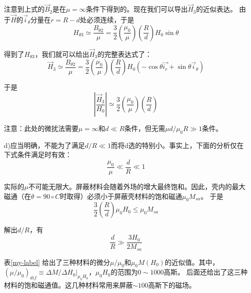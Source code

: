 注意到上式的$\vec{B}_2$是在$\mu=\infty$条件下得到的。现在我们可以导出$\vec{H}_3$的近似表达。
由于$\vec{H}$的$\vec{i}_\theta$分量在$r=R-d$处必须连续，于是
$$
H_{\theta 3}\simeq \frac{B_{\theta 2}}{\mu}=\frac{3}{2}(\frac{\mu_0}{\mu})(\frac{R}{d})H_0\sin\theta
$$

得到了$H_{\theta 3}$，我们就可以给出$\vec{H}_3$的完整表达式了：
$$
\vec{H}_3\simeq \frac{B_{\theta 2}}{\mu}=\frac{3}{2}(\frac{\mu_0}{\mu})(\frac{R}{d})H_0(-\cos\theta\vec{i_r}+\sin\theta\vec{i}_\theta)
$$

于是
$$\left|\frac{\vec{H}_3}{H_0}\right|\simeq \frac{3}{2}(\frac{\mu_0}{\mu})(\frac{R}{d})$$

注意：此处的微扰法需要$\mu=\infty$和$d\ll R$条件，但无需$\mu d/\mu_0 R \gg 1$条件。

d)应当明确，不能为了满足$d/R \ll 1$而将d选的特别小。事实上，下面的分析仅在下式条件满足时有效：
$$
\frac{\mu_0}{\mu} \ll \frac{d}{R} \ll 1
$$

实际的$\mu$不可能无限大。屏蔽材料会随着外场的增大最终饱和。因此，壳内的最大磁通（在$\theta=90\circ C$时取得）必须小于屏蔽壳材料的饱和磁通$\mu_0 M_{sa}$。
于是
$$
\frac{3}{2}(\frac{R}{d})\mu_0 H_0 \le \mu_0 M_{sa}
$$

解出$d/R$，有
$$\frac{d}{R}\gg \frac{3H_0}{2M_{sa}}$$

表\ref{my-label} 给出了三种材料的微分$\mu/\mu_0$和$\mu_0M(H_0)$的近似值。其中，$(\mu/\mu_0)_{dif}\equiv \Delta M/ \Delta H_0 |_{\mu_0 H_0}$，$\mu_0 H_0$的范围为$0\sim 1000$高斯。
后面还给出了这三种材料的饱和磁通值。这几种材料常用来屏蔽$\sim 100$高斯下的磁场。

